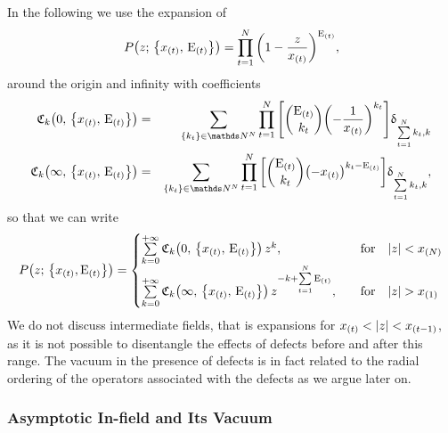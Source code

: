 In the following we use the expansion of
\begin{equation}
  P\qty(z;\, \qty{ x_{(t)},\, \rE_{(t)} } )
  =
  \finiteprod{t}{1}{N}
  \qty( 1- \frac{z}{x_{(t)}} )^{\rE_{(t)}},
\end{equation}
around the origin and infinity with coefficients   
\begin{eqnarray}
  \cmode{k}{0}{\rE_{(t)}}{x_{(t)}}
  & = &
  \sum_{ \qty{k_t} \in \N^N} 
  \finiteprod{t}{1}{N}
  \qty[ \binom{\rE_{(t)}}{k_t} \qty( - \frac{1}{x_{(t)}} )^{k_t} ]
  \delta_{\finitesum{t}{1}{N} k_t, k}
  \\
  \cmode{k}{\infty}{\rE_{(t)}}{x_{(t)}}
  & = &
  \sum_{ \qty{k_t} \in \N^N}
  \finiteprod{t}{1}{N}
  \qty[ \binom{\rE_{(t)}}{k_t} \qty( - x_{(t)} )^{k_t - \rE_{(t)}} ]
  \delta_{\finitesum{t}{1}{N} k_t, k}, 
\end{eqnarray}
so that we can write
\begin{equation}
  \begin{split}
    P\qty(z;\, \qty{x_{(t)}, \rE_{(t)}})
    =
    \begin{cases}
      \zeroinfsum{k}
      \cmode{k}{0}{\rE_{(t)}}{x_{(t)}}\, z^k,
      & \qfor
      \abs{z} < x_{(N)}
      \\
      \zeroinfsum{k}
      \cmode{k}{\infty}{\rE_{(t)}}{x_{(t)}}\, z^{-k+\finitesum{t}{1}{N} \rE_{(t)}},
      & \qfor
      \abs{z} > x_{(1)}
    \end{cases}
  \end{split}
\end{equation}
We do not discuss intermediate fields, that is expansions for $x_{(t)} < \abs{z} < x_{(t-1)}$, as it is not possible to disentangle the effects  of defects before and after this range.
The vacuum in the presence of defects is in fact related to the radial ordering of the operators associated with the defects as we argue later on.
    

\subsubsection{Asymptotic In-field and Its Vacuum}

